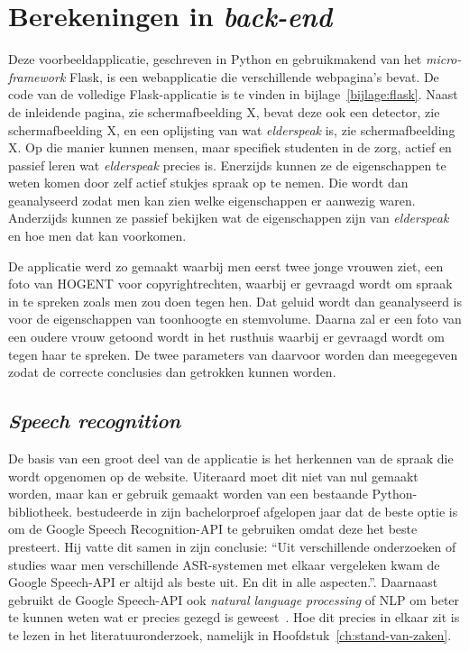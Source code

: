 \section{Berekeningen in \textit{back-end}}
Deze voorbeeldapplicatie, geschreven in Python en gebruikmakend van het \textit{micro-framework} Flask, is een webapplicatie die verschillende webpagina’s bevat. De code van de volledige Flask-applicatie is te vinden in bijlage~\ref{bijlage:flask}. Naast de inleidende pagina, zie schermafbeelding X, bevat deze ook een detector, zie schermafbeelding X, en een oplijsting van wat \textit{elderspeak} is, zie schermafbeelding X. Op die manier kunnen mensen, maar specifiek studenten in de zorg, actief en passief leren wat \textit{elderspeak} precies is. Enerzijds kunnen ze de eigenschappen te weten komen door zelf actief stukjes spraak op te nemen. Die wordt dan geanalyseerd zodat men kan zien welke eigenschappen er aanwezig waren. Anderzijds kunnen ze passief bekijken wat de eigenschappen zijn van \textit{elderspeak} en hoe men dat kan voorkomen.

De applicatie werd zo gemaakt waarbij men eerst twee jonge vrouwen ziet, een foto van HOGENT voor copyrightrechten, waarbij er gevraagd wordt om spraak in te spreken zoals men zou doen tegen hen. Dat geluid wordt dan geanalyseerd is voor de eigenschappen van toonhoogte en stemvolume. Daarna zal er een foto van een oudere vrouw getoond wordt in het rusthuis waarbij er gevraagd wordt om tegen haar te spreken. De twee parameters van daarvoor worden dan meegegeven zodat de correcte conclusies dan getrokken kunnen worden.

\subsection{\textit{Speech recognition}}
De basis van een groot deel van de applicatie is het herkennen van de spraak die wordt opgenomen op de website. Uiteraard moet dit niet van nul gemaakt worden, maar kan er gebruik gemaakt worden van een bestaande Python-bibliotheek. \textcite{Standaert2021} bestudeerde in zijn bachelorproef afgelopen jaar dat de beste optie is om de Google Speech Recognition-API te gebruiken omdat deze het beste presteert. Hij vatte dit samen in zijn conclusie: ``Uit verschillende onderzoeken of studies waar men verschillende ASR-systemen met elkaar vergeleken kwam de Google Speech-API er altijd als beste uit. En dit in alle aspecten.''. Daarnaast gebruikt de Google Speech-API ook \textit{natural language processing} of NLP om beter te kunnen weten wat er precies gezegd is geweest~\autocite{GoogleCloud2022}. Hoe dit precies in elkaar zit is te lezen in het literatuuronderzoek, namelijk in Hoofdstuk~\ref{ch:stand-van-zaken}.

